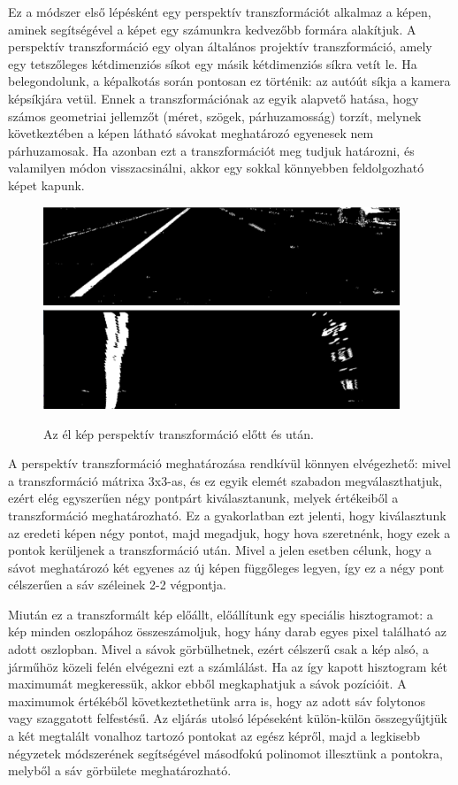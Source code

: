 \documentclass[12pt,a4paper,oneside]{report}             %
\begin{document}
Ez a módszer első lépésként egy perspektív transzformációt alkalmaz a képen, aminek segítségével a képet egy számunkra kedvezőbb formára alakítjuk. A perspektív transzformáció egy olyan általános projektív transzformáció, amely egy tetszőleges kétdimenziós síkot egy másik kétdimenziós síkra vetít le. Ha belegondolunk, a képalkotás során pontosan ez történik: az autóút síkja a kamera képsíkjára vetül. Ennek a transzformációnak az egyik alapvető hatása, hogy számos geometriai jellemzőt (méret, szögek, párhuzamosság) torzít, melynek következtében a képen látható sávokat meghatározó egyenesek nem párhuzamosak. Ha azonban ezt a transzformációt meg tudjuk határozni, és valamilyen módon visszacsinálni, akkor egy sokkal könnyebben feldolgozható képet kapunk.

\begin{figure}[!htb]
	\centering
	\includegraphics[width=0.95\textwidth]{images/11.png}
	\includegraphics[width=0.95\textwidth]{images/12.png}
	\label{fig:1}
	\caption{Az él kép perspektív transzformáció előtt és után.}
\end{figure}

A perspektív transzformáció meghatározása rendkívül könnyen elvégezhető: mivel a transzformáció mátrixa 3x3-as, és ez egyik elemét szabadon megválaszthatjuk, ezért elég egyszerűen négy pontpárt kiválasztanunk, melyek értékeiből a transzformáció meghatározható. Ez a gyakorlatban ezt jelenti, hogy kiválasztunk az eredeti képen négy pontot, majd megadjuk, hogy hova szeretnénk, hogy ezek a pontok kerüljenek a transzformáció után. Mivel a jelen esetben célunk, hogy a sávot meghatározó két egyenes az új képen függőleges legyen, így ez a négy pont célszerűen a sáv széleinek 2-2 végpontja.

Miután ez a transzformált kép előállt, előállítunk egy speciális hisztogramot: a kép minden oszlopához összeszámoljuk, hogy hány darab egyes pixel található az adott oszlopban. Mivel a sávok görbülhetnek, ezért célszerű csak a kép alsó, a járműhöz közeli felén elvégezni ezt a számlálást. Ha az így kapott hisztogram két maximumát megkeressük, akkor ebből megkaphatjuk a sávok pozícióit. A maximumok értékéből következtethetünk arra is, hogy az adott sáv folytonos vagy szaggatott felfestésű. Az eljárás utolsó lépéseként külön-külön összegyűjtjük a két megtalált vonalhoz tartozó pontokat az egész képről, majd a legkisebb négyzetek módszerének segítségével másodfokú polinomot illesztünk a pontokra, melyből a sáv görbülete meghatározható.
\end{document}

